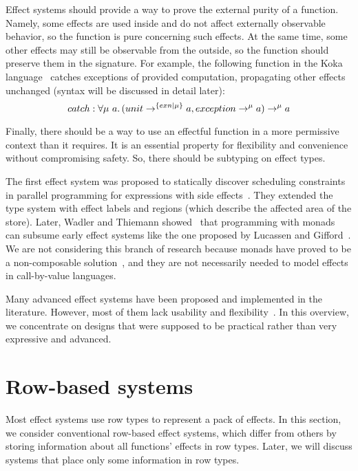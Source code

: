 \documentclass[conference]{IEEEtran}
\newcommand{\ap}{~}
\begin{document}
    Effect systems should provide a way to prove the external purity of a function.
    Namely, some effects are used inside and do not affect externally observable behavior, so the function is pure concerning such effects.
    At the same time, some other effects may still be observable from the outside, so the function should preserve them in the signature.
    For example, the following function in the Koka language~\cite{leijen2014koka, leijen2017type} catches exceptions of provided computation, propagating other effects unchanged (syntax will be discussed in detail later):
    \[catch : \forall \mu\ap a\ldotp (unit\to^{\{exn|\mu\}} a, exception \to^{\mu} a) \to^\mu a\]

    Finally, there should be a way to use an effectful function in a more permissive context than it requires.
    It is an essential property for flexibility and convenience without compromising safety.
    So, there should be subtyping on effect types.


    The first effect system was proposed to statically discover scheduling constraints in parallel programming for expressions with side effects~\cite{lucassen1988polymorphic}.
    They extended the type system with effect labels and regions (which describe the affected area of the store).
    Later, Wadler and Thiemann showed~\cite{wadler2003marriage} that programming with monads~\cite{moggi1988computational} can subsume early effect systems like the one proposed by Lucassen and Gifford~\cite{lucassen1988polymorphic}.
    We are not considering this branch of research because monads have proved to be a non-composable solution~\cite{liang1995monad, kiselyov2013extensible}, and they are not necessarily needed to model effects in call-by-value languages.

    Many advanced effect systems have been proposed and implemented in the literature.
    However, most of them lack usability and flexibility~\cite{odersky2022scoped}.
    In this overview, we concentrate on designs that were supposed to be practical rather than very expressive and advanced.


    \section{Row-based systems} \label{sec:rows}

    Most effect systems use row types to represent a pack of effects.
    In this section, we consider conventional row-based effect systems, which differ from others by storing information about all functions' effects in row types.
    Later, we will discuss systems that place only some information in row types.
\end{document}
